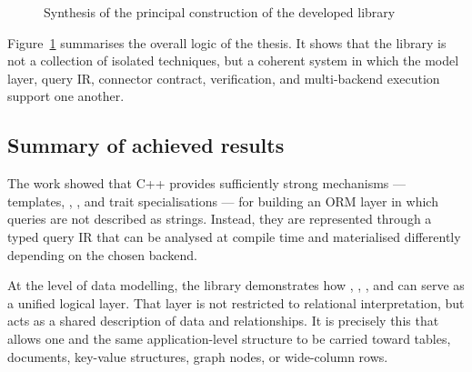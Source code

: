 \begin{figure}[H]
\centering
{}
\caption{Synthesis of the principal construction of the developed library}
\label{fig:thesis_synthesis}
\end{figure}

Figure~\ref{fig:thesis_synthesis} summarises the overall logic of the thesis. It shows that the library is not a collection of isolated techniques, but a coherent system in which the model layer, query IR, connector contract, verification, and multi-backend execution support one another.

\subsection{Summary of achieved results}

The work showed that C++ provides sufficiently strong mechanisms --- templates, , , and trait specialisations --- for building an ORM layer in which queries are not described as strings. Instead, they are represented through a typed query IR that can be analysed at compile time and materialised differently depending on the chosen backend.

At the level of data modelling, the library demonstrates how , , , and  can serve as a unified logical layer. That layer is not restricted to relational interpretation, but acts as a shared description of data and relationships. It is precisely this that allows one and the same application-level structure to be carried toward tables, documents, key-value structures, graph nodes, or wide-column rows.

